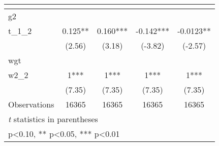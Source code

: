 \begin{table}[htbp]\centering
\def\sym#1{\ifmmode^{#1}\else\(^{#1}\)\fi}
\caption{ \label{tab1}}
\begin{tabular}{l*{4}{c}}
\toprule
                    &\multicolumn{1}{c}{}&\multicolumn{1}{c}{}&\multicolumn{1}{c}{}&\multicolumn{1}{c}{}\\
\midrule
g2                  &               &               &               &               \\
t\_1\_2               &       0.125** &       0.160***&      -0.142***&     -0.0123** \\
                    &      (2.56)   &      (3.18)   &     (-3.82)   &     (-2.57)   \\
\midrule
wgt                 &               &               &               &               \\
w2\_2                &           1***&           1***&           1***&           1***\\
                    &      (7.35)   &      (7.35)   &      (7.35)   &      (7.35)   \\
\midrule
Observations        &       16365   &       16365   &       16365   &       16365   \\
\bottomrule
\multicolumn{5}{l}{\footnotesize \textit{t} statistics in parentheses}\\
\multicolumn{5}{l}{\footnotesize * p<0.10, ** p<0.05, *** p<0.01}\\
\end{tabular}
\end{table}
